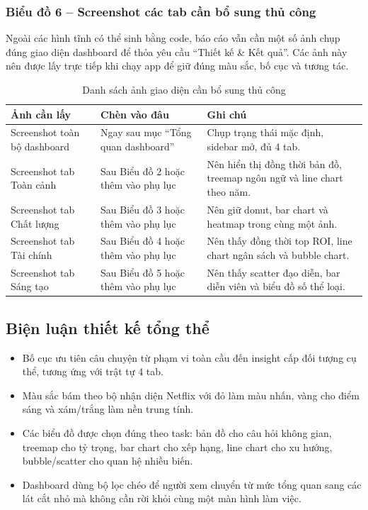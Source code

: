 \subsubsection*{Biểu đồ 6 -- Screenshot các tab cần bổ sung thủ công}

Ngoài các hình tĩnh có thể sinh bằng code, báo cáo vẫn cần một số ảnh chụp đúng giao diện dashboard để thỏa yêu cầu ``Thiết kế \& Kết quả''. Các ảnh này nên được lấy trực tiếp khi chạy app để giữ đúng màu sắc, bố cục và tương tác.

\begin{table}[H]
\centering
\renewcommand{\arraystretch}{1.3}
\begin{tabularx}{\textwidth}{|p{3.3cm}|p{4.2cm}|X|}
\hline
\textbf{Ảnh cần lấy} & \textbf{Chèn vào đâu} & \textbf{Ghi chú} \\
\hline
Screenshot toàn bộ dashboard & Ngay sau mục ``Tổng quan dashboard'' & Chụp trạng thái mặc định, sidebar mở, đủ 4 tab. \\
\hline
Screenshot tab Toàn cảnh & Sau Biểu đồ 2 hoặc thêm vào phụ lục & Nên hiển thị đồng thời bản đồ, treemap ngôn ngữ và line chart theo năm. \\
\hline
Screenshot tab Chất lượng & Sau Biểu đồ 3 hoặc thêm vào phụ lục & Nên giữ donut, bar chart và heatmap trong cùng một ảnh. \\
\hline
Screenshot tab Tài chính & Sau Biểu đồ 4 hoặc thêm vào phụ lục & Nên thấy đồng thời top ROI, line chart ngân sách và bubble chart. \\
\hline
Screenshot tab Sáng tạo & Sau Biểu đồ 5 hoặc thêm vào phụ lục & Nên thấy scatter đạo diễn, bar diễn viên và biểu đồ số thể loại. \\
\hline
\end{tabularx}
\caption{Danh sách ảnh giao diện cần bổ sung thủ công}
\end{table}

\subsection{Biện luận thiết kế tổng thể}
\begin{itemize}[leftmargin=2em]
    \item Bố cục ưu tiên câu chuyện từ phạm vi toàn cầu đến insight cấp đối tượng cụ thể, tương ứng với trật tự 4 tab.
    \item Màu sắc bám theo bộ nhận diện Netflix với đỏ làm màu nhấn, vàng cho điểm sáng và xám/trắng làm nền trung tính.
    \item Các biểu đồ được chọn đúng theo task: bản đồ cho câu hỏi không gian, treemap cho tỷ trọng, bar chart cho xếp hạng, line chart cho xu hướng, bubble/scatter cho quan hệ nhiều biến.
    \item Dashboard dùng bộ lọc chéo để người xem chuyển từ mức tổng quan sang các lát cắt nhỏ mà không cần rời khỏi cùng một màn hình làm việc.
\end{itemize}


